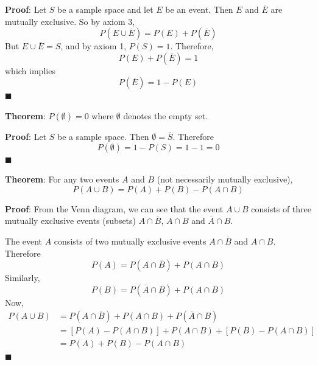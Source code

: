 \documentclass[twoside]{book}
\begin{document}
\textbf{Proof}: Let $S$ be a sample space and let $E$ be an event. Then $E$ and $\overline{E}$ are mutually exclusive. So by axiom 3,
$$P(E \cup \overline{E}) = P(E) + P(\overline{E})$$
But $E \cup \overline{E} = S$, and by axiom 1, $P(S) = 1$. Therefore,
$$P(E) + P(\overline{E}) = 1$$
which implies
$$P(\overline{E}) = 1 - P(E)$$
\hfill\(\blacksquare\)

\begin{textbox}
\textbf{Theorem}: $P(\emptyset) = 0$ where $\emptyset$ denotes the empty set.
\end{textbox}

\textbf{Proof}: Let $S$ be a sample space. Then $\emptyset = \overline{S}$. Therefore
$$P(\emptyset) = 1-P(S) = 1-1 = 0$$
\hfill\(\blacksquare\)

\begin{textbox}
\textbf{Theorem}: For any two events $A$ and $B$ (not necessarily mutually exclusive), $$P(A \cup B) = P(A) + P(B) - P(A \cap B)$$
\end{textbox}

\textbf{Proof}: From the Venn diagram, we can see that the event $A \cup B$ consists of three mutually exclusive events (subsets) $A \cap \overline{B}$, $A \cap B$ and $\overline{A} \cap B$.
\begin{center}
\end{center}


The event $A$ consists of two mutually exclusive events $A \cap \overline{B}$ and $A \cap B$. Therefore
$$P(A) = P(A \cap \overline{B})+P(A \cap B)$$
Similarly,
$$P(B) = P(\overline{A} \cap B)+P(A \cap B)$$
Now,
\begin{align*}
    P(A \cup B) &= P(A \cap \overline{B})+P(A \cap B)+P(\overline{A} \cap B) \\
    &= \left[P(A) - P(A \cap B)\right] + P(A \cap B) + \left[P(B) - P(A \cap B)\right] \\
    &=P(A) + P(B) - P(A \cap B)
\end{align*}
\hfill\(\blacksquare\)
\end{document}
